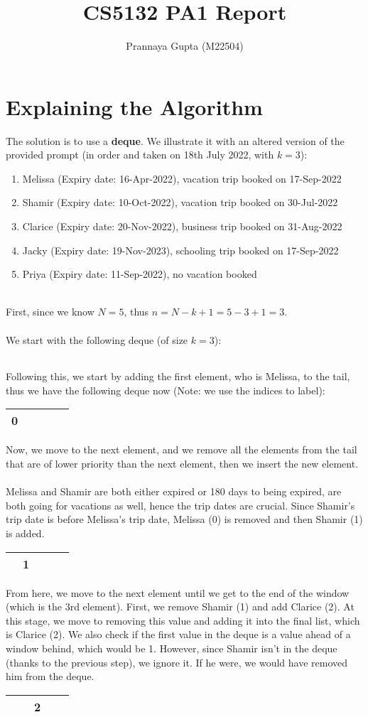 \documentclass{article}
\title{CS5132 PA1 Report}
\author{Prannaya Gupta (M22504)}
\newcommand{\arraySpaceFive}[5]{%
\begin{center}%
\begin{tabular}{|c|c|c|c|c|}%
\hline #1 & #2 & #3 & #4 & #5 \\ \hline %
\end{tabular} %
\end{center} %
}
\begin{document}
\maketitle

\section{Explaining the Algorithm}
The solution is to use a \textbf{deque}. We illustrate it with an altered version of the provided prompt (in order and taken on 18th July 2022, with $k = 3$):
\begin{enumerate}
    \item Melissa (Expiry date: 16-Apr-2022), vacation trip booked on 17-Sep-2022
    \item Shamir (Expiry date: 10-Oct-2022), vacation trip booked on 30-Jul-2022
    \item Clarice (Expiry date: 20-Nov-2022), business trip booked on 31-Aug-2022
    \item Jacky (Expiry date: 19-Nov-2023), schooling trip booked on 17-Sep-2022
    \item Priya (Expiry date: 11-Sep-2022), no vacation booked
\end{enumerate} 
\\
First, since we know $N = 5$, thus $n = N - k + 1 = 5 - 3 + 1 = 3$.\\
\\ We start with the following deque (of size $k = 3$):
\arraySpaceFive{}{}{}{}{}

Following this, we start by adding the first element, who is Melissa, to the tail, thus we have the following deque now (Note: we use the indices to label):
\arraySpaceFive{0}{}{}{}{}

Now, we move to the next element, and we remove all the elements from the tail that are of lower priority than the next element, then we insert the new element. \\
\\
Melissa and Shamir are both either expired or 180 days to being expired, are both going for vacations as well, hence the trip dates are crucial. Since Shamir’s trip date is before Melissa’s trip date, Melissa (0) is removed and then Shamir (1) is added.
\arraySpaceFive{}{1}{}{}{}

From here, we move to the next element until we get to the end of the window (which is the 3rd element). First, we remove Shamir (1) and add Clarice (2). At this stage, we move to removing this value and adding it into the final list, which is Clarice (2). We also check if the first value in the deque is a value ahead of a window behind, which would be 1. However, since Shamir isn’t in the deque (thanks to the previous step), we ignore it. If he were, we would have removed him from the deque.
\arraySpaceFive{}{}{2}{}{}
\end{document}
